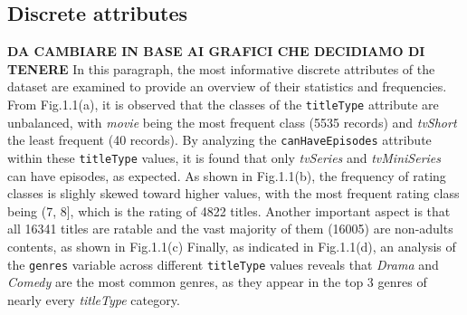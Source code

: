 \subsection{Discrete attributes}
\textbf{DA CAMBIARE IN BASE AI GRAFICI CHE DECIDIAMO DI TENERE}
In this paragraph, the most informative discrete attributes of the dataset are examined to provide an overview of their statistics and frequencies. \\
From Fig.1.1(a), it is observed that the classes of the \texttt{titleType} attribute are unbalanced, with \textit{movie} being the most frequent class (5535 records) and \textit{tvShort} the least frequent (40 records). 
By analyzing the \texttt{canHaveEpisodes} attribute within these \texttt{titleType} values, it is found that only \textit{tvSeries} and \textit{tvMiniSeries} can have episodes, as expected.
As shown in Fig.1.1(b), the frequency of rating classes is slighly skewed toward higher values, with the most frequent rating class being (7, 8], which is the rating of 4822 titles.
Another important aspect is that all 16341 titles are ratable and the vast majority of them (16005) are non-adults contents, as shown in Fig.1.1(c)
Finally, as indicated in Fig.1.1(d), an analysis of the \texttt{genres} variable across different \texttt{titleType} values reveals that \textit{Drama} and \textit{Comedy} are the most common genres, as they appear in the top 3 genres of nearly every \textit{titleType} category.
